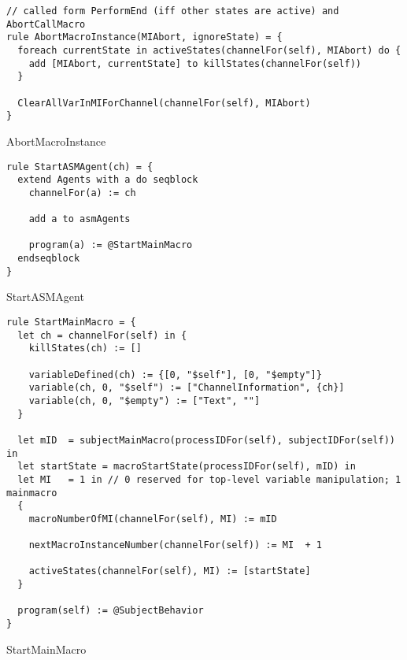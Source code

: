 \begin{listing}[H]
\begin{verbatim}
// called form PerformEnd (iff other states are active) and AbortCallMacro
rule AbortMacroInstance(MIAbort, ignoreState) = {
  foreach currentState in activeStates(channelFor(self), MIAbort) do {
    add [MIAbort, currentState] to killStates(channelFor(self))
  }

  ClearAllVarInMIForChannel(channelFor(self), MIAbort)
}
\end{verbatim}
\caption{AbortMacroInstance}
\label{lst:asm:AbortMacroInstance}
\end{listing}




\begin{listing}[H]
\begin{verbatim}
rule StartASMAgent(ch) = {
  extend Agents with a do seqblock
    channelFor(a) := ch

    add a to asmAgents

    program(a) := @StartMainMacro
  endseqblock
}
\end{verbatim}
\caption{StartASMAgent}
\label{lst:asm:StartASMAgent}
\end{listing}


\begin{listing}[H]
\begin{verbatim}
rule StartMainMacro = {
  let ch = channelFor(self) in {
    killStates(ch) := []

    variableDefined(ch) := {[0, "$self"], [0, "$empty"]}
    variable(ch, 0, "$self") := ["ChannelInformation", {ch}]
    variable(ch, 0, "$empty") := ["Text", ""]
  }

  let mID  = subjectMainMacro(processIDFor(self), subjectIDFor(self)) in
  let startState = macroStartState(processIDFor(self), mID) in
  let MI   = 1 in // 0 reserved for top-level variable manipulation; 1 mainmacro
  {
    macroNumberOfMI(channelFor(self), MI) := mID

    nextMacroInstanceNumber(channelFor(self)) := MI  + 1

    activeStates(channelFor(self), MI) := [startState]
  }

  program(self) := @SubjectBehavior
}
\end{verbatim}
\caption{StartMainMacro}
\label{lst:asm:StartMainMacro}
\end{listing}




